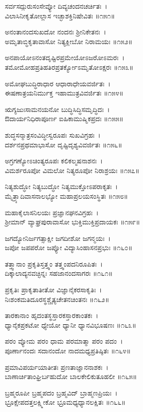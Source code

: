 ಸರ್ವಸದ್ಗುರುಸಂಸೇವ್ಯೋ ದಿವ್ಯಚಂದನಚರ್ಚಿತಃ~।\\
ವಿಲಾಸಿನೀಕೃತೋಲ್ಲಾಸ ಇಚ್ಛಾಶಕ್ತಿನಿಷೇವಿತಃ ॥೧೫೧॥

	ಅನಂತಾನಂದಸುಖದೋ ನಂದನಃ ಶ್ರೀನಿಕೇತನಃ~।\\
	ಅಮೃತಾಬ್ಧಿಕೃತಾವಾಸೋ ನಿತ್ಯಕ್ಲೀಬೋ ನಿರಾಮಯಃ ॥೧೫೨॥

ಅನಪಾಯೋಽನಂತದೃಷ್ಟಿರಪ್ರಮೇಯೋಽಜರೋಽಮರಃ~।\\
ತಮೋಮೋಹಪ್ರತಿಹತಿರಪ್ರತರ್ಕ್ಯೋಽಮೃತೋಽಕ್ಷರಃ ॥೧೫೩॥

	ಅಮೋಘಬುದ್ಧಿರಾಧಾರ ಆಧಾರಾಧೇಯವರ್ಜಿತಃ~।\\
	ಈಷಣಾತ್ರಯನಿರ್ಮುಕ್ತ ಇಹಾಮುತ್ರವಿವರ್ಜಿತಃ ॥೧೫೪॥

ಋಗ್ಯಜುಃಸಾಮನಯನೋ ಬುದ್ಧಿಸಿದ್ಧಿಸಮೃದ್ಧಿದಃ~।\\
ಔದಾರ್ಯನಿಧಿರಾಪೂರ್ಣ ಐಹಿಕಾಮುಷ್ಮಿಕಪ್ರದಃ ॥೧೫೫॥

	ಶುದ್ಧಸನ್ಮಾತ್ರಸಂವಿದ್ಧೀಸ್ವರೂಪಃ ಸುಖವಿಗ್ರಹಃ~।\\
	ದರ್ಶನಪ್ರಥಮಾಭಾಸೋ ದೃಷ್ಟಿದೃಶ್ಯವಿವರ್ಜಿತಃ ॥೧೫೬॥

ಅಗ್ರಗಣ್ಯೋಽಚಿಂತ್ಯರೂಪಃ ಕಲಿಕಲ್ಮಷನಾಶನಃ~।\\
ವಿಮರ್ಶರೂಪೋ ವಿಮಲೋ ನಿತ್ಯರೂಪೋ ನಿರಾಶ್ರಯಃ ॥೧೫೭॥

ನಿತ್ಯಶುದ್ಧೋ ನಿತ್ಯಬುದ್ಧೋ ನಿತ್ಯಮುಕ್ತೋಽಪರಾಕೃತಃ~।\\
ಮೈತ್ರ್ಯಾದಿವಾಸನಾಲಭ್ಯೋ ಮಹಾಪ್ರಲಯಸಂಸ್ಥಿತಃ ॥೧೫೮॥

ಮಹಾಕೈಲಾಸನಿಲಯಃ ಪ್ರಜ್ಞಾನಘನವಿಗ್ರಹಃ~।\\
ಶ್ರೀಮಾನ್ ವ್ಯಾಘ್ರಪುರಾವಾಸೋ ಭುಕ್ತಿಮುಕ್ತಿಪ್ರದಾಯಕಃ ॥೧೫೯॥

	ಜಗದ್ಯೋನಿರ್ಜಗತ್ಸಾಕ್ಷೀ ಜಗದೀಶೋ ಜಗನ್ಮಯಃ~।\\
	ಜಪೋ ಜಪಪರೋ ಜಪ್ಯೋ ವಿದ್ಯಾಸಿಂಹಾಸನಪ್ರಭುಃ ॥೧೬೦॥

ತತ್ತ್ವಾನಾಂ ಪ್ರಕೃತಿಸ್ತತ್ತ್ವಂ ತತ್ತ್ವಂಪದನಿರೂಪಿತಃ~।\\
ದಿಕ್ಕಾಲಾದ್ಯನವಚ್ಛಿನ್ನಃ ಸಹಜಾನಂದಸಾಗರಃ ॥೧೬೧॥

	ಪ್ರಕೃತಿಃ ಪ್ರಾಕೃತಾತೀತೋ ವಿಜ್ಞಾನೈಕರಸಾಕೃತಿಃ~।\\
	ನಿಃಶಂಕಮತಿದೂರಸ್ಥಶ್ಚೈತ್ಯಚೇತನಚಿಂತನಃ ॥೧೬೨॥

ತಾರಕಾನಾಂ ಹೃದಂತಸ್ಥಸ್ತಾರಕಸ್ತಾರಕಾಂತಕಃ~।\\
ಧ್ಯಾನೈಕಪ್ರಕಟೋ ಧ್ಯೇಯೋ ಧ್ಯಾನೀ ಧ್ಯಾನವಿಭೂಷಣಃ ॥೧೬೩॥

	ಪರಂ ವ್ಯೋಮ ಪರಂ ಧಾಮ ಪರಮಾತ್ಮಾ ಪರಂ ಪದಂ~।\\
	ಪೂರ್ಣಾನಂದಃ ಸದಾನಂದೋ ನಾದಮಧ್ಯಪ್ರತಿಷ್ಠಿತಃ ॥೧೬೪॥

ಪ್ರಮಾವಿಪರ್ಯಯಾತೀತಃ ಪ್ರಣತಾಜ್ಞಾನನಾಶಕಃ~।\\
ಬಾಣಾರ್ಚಿತಾಂಘ್ರಿರ್ಬಹುದೋ ಬಾಲಕೇಲಿಕುತೂಹಲೀ ॥೧೬೫॥

	ಬ್ರಹ್ಮರೂಪೀ ಬ್ರಹ್ಮಪದಂ ಬ್ರಹ್ಮವಿದ್ ಬ್ರಾಹ್ಮಣಪ್ರಿಯಃ~।\\
	ಭ್ರೂಕ್ಷೇಪದತ್ತಲಕ್ಷ್ಮೀಕೋ ಭ್ರೂಮಧ್ಯಧ್ಯಾನಲಕ್ಷಿತಃ ॥೧೬೬॥

